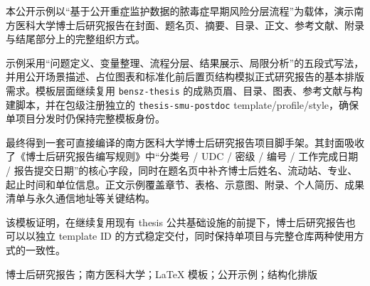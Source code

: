 本公开示例以“基于公开重症监护数据的脓毒症早期风险分层流程”为载体，演示南方医科大学博士后研究报告在封面、题名页、摘要、目录、正文、参考文献、附录与结尾部分上的完整组织方式。

示例采用“问题定义、变量整理、流程分层、结果展示、局限分析”的五段式写法，并用公开场景描述、占位图表和标准化前后置页结构模拟正式研究报告的基本排版需求。模板层面继续复用 \texttt{bensz-thesis} 的成熟页眉、目录、图表、参考文献与构建脚本，并在包级注册独立的 \texttt{thesis-smu-postdoc} template/profile/style，确保单项目分发时仍保持完整模板身份。

最终得到一套可直接编译的南方医科大学博士后研究报告项目脚手架。其封面吸收了《博士后研究报告编写规则》中“分类号 / UDC / 密级 / 编号 / 工作完成日期 / 报告提交日期”的核心字段，同时在题名页中补齐博士后姓名、流动站、专业、起止时间和单位信息。正文示例覆盖章节、表格、示意图、附录、个人简历、成果清单与永久通信地址等关键结构。

该模板证明，在继续复用现有 thesis 公共基础设施的前提下，博士后研究报告也可以以独立 template ID 的方式稳定交付，同时保持单项目与完整仓库两种使用方式的一致性。

博士后研究报告；南方医科大学；LaTeX 模板；公开示例；结构化排版
